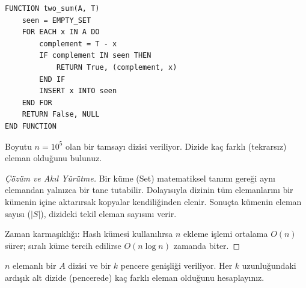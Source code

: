 \begin{lstlisting}
FUNCTION two_sum(A, T)
    seen = EMPTY_SET
    FOR EACH x IN A DO
        complement = T - x
        IF complement IN seen THEN
            RETURN True, (complement, x)
        END IF
        INSERT x INTO seen
    END FOR
    RETURN False, NULL
END FUNCTION\end{lstlisting}

\begin{example}
Boyutu $n = 10^5$ olan bir tamsayı dizisi veriliyor. Dizide kaç farklı (tekrarsız) eleman olduğunu bulunuz.
\end{example}

\begin{proof}[Çözüm ve Akıl Yürütme]
Bir küme (Set) matematiksel tanımı gereği aynı elemandan yalnızca bir tane tutabilir. Dolayısıyla dizinin tüm elemanlarını bir kümenin içine aktarırsak kopyalar kendiliğinden elenir. Sonuçta kümenin eleman sayısı ($|S|$), dizideki tekil eleman sayısını verir.

Zaman karmaşıklığı: Hash kümesi kullanılırsa $n$ ekleme işlemi ortalama $O(n)$ sürer; sıralı küme tercih edilirse $O(n \log n)$ zamanda biter.
\end{proof}

\begin{example}
$n$ elemanlı bir $A$ dizisi ve bir $k$ pencere genişliği veriliyor. Her $k$ uzunluğundaki ardışık alt dizide (pencerede) kaç farklı eleman olduğunu hesaplayınız.
\end{example}

